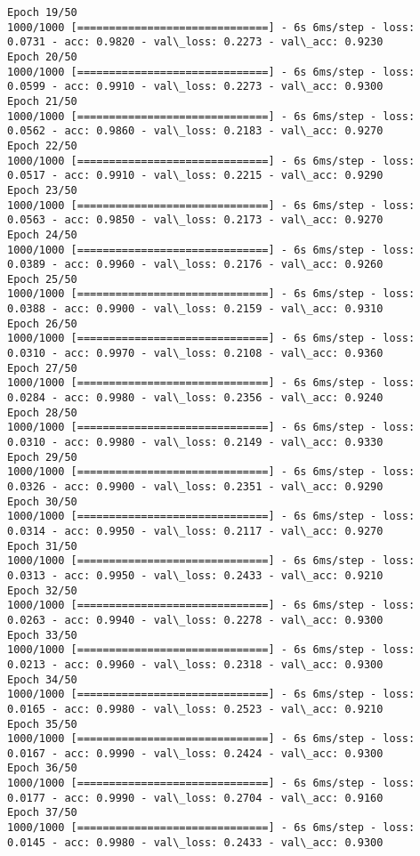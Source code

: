 \documentclass[11pt]{article}
\begin{document}
\begin{Verbatim}[commandchars=\\\{\}]
Epoch 19/50
1000/1000 [==============================] - 6s 6ms/step - loss: 0.0731 - acc: 0.9820 - val\_loss: 0.2273 - val\_acc: 0.9230
Epoch 20/50
1000/1000 [==============================] - 6s 6ms/step - loss: 0.0599 - acc: 0.9910 - val\_loss: 0.2273 - val\_acc: 0.9300
Epoch 21/50
1000/1000 [==============================] - 6s 6ms/step - loss: 0.0562 - acc: 0.9860 - val\_loss: 0.2183 - val\_acc: 0.9270
Epoch 22/50
1000/1000 [==============================] - 6s 6ms/step - loss: 0.0517 - acc: 0.9910 - val\_loss: 0.2215 - val\_acc: 0.9290
Epoch 23/50
1000/1000 [==============================] - 6s 6ms/step - loss: 0.0563 - acc: 0.9850 - val\_loss: 0.2173 - val\_acc: 0.9270
Epoch 24/50
1000/1000 [==============================] - 6s 6ms/step - loss: 0.0389 - acc: 0.9960 - val\_loss: 0.2176 - val\_acc: 0.9260
Epoch 25/50
1000/1000 [==============================] - 6s 6ms/step - loss: 0.0388 - acc: 0.9900 - val\_loss: 0.2159 - val\_acc: 0.9310
Epoch 26/50
1000/1000 [==============================] - 6s 6ms/step - loss: 0.0310 - acc: 0.9970 - val\_loss: 0.2108 - val\_acc: 0.9360
Epoch 27/50
1000/1000 [==============================] - 6s 6ms/step - loss: 0.0284 - acc: 0.9980 - val\_loss: 0.2356 - val\_acc: 0.9240
Epoch 28/50
1000/1000 [==============================] - 6s 6ms/step - loss: 0.0310 - acc: 0.9980 - val\_loss: 0.2149 - val\_acc: 0.9330
Epoch 29/50
1000/1000 [==============================] - 6s 6ms/step - loss: 0.0326 - acc: 0.9900 - val\_loss: 0.2351 - val\_acc: 0.9290
Epoch 30/50
1000/1000 [==============================] - 6s 6ms/step - loss: 0.0314 - acc: 0.9950 - val\_loss: 0.2117 - val\_acc: 0.9270
Epoch 31/50
1000/1000 [==============================] - 6s 6ms/step - loss: 0.0313 - acc: 0.9950 - val\_loss: 0.2433 - val\_acc: 0.9210
Epoch 32/50
1000/1000 [==============================] - 6s 6ms/step - loss: 0.0263 - acc: 0.9940 - val\_loss: 0.2278 - val\_acc: 0.9300
Epoch 33/50
1000/1000 [==============================] - 6s 6ms/step - loss: 0.0213 - acc: 0.9960 - val\_loss: 0.2318 - val\_acc: 0.9300
Epoch 34/50
1000/1000 [==============================] - 6s 6ms/step - loss: 0.0165 - acc: 0.9980 - val\_loss: 0.2523 - val\_acc: 0.9210
Epoch 35/50
1000/1000 [==============================] - 6s 6ms/step - loss: 0.0167 - acc: 0.9990 - val\_loss: 0.2424 - val\_acc: 0.9300
Epoch 36/50
1000/1000 [==============================] - 6s 6ms/step - loss: 0.0177 - acc: 0.9990 - val\_loss: 0.2704 - val\_acc: 0.9160
Epoch 37/50
1000/1000 [==============================] - 6s 6ms/step - loss: 0.0145 - acc: 0.9980 - val\_loss: 0.2433 - val\_acc: 0.9300

\end{Verbatim}
\end{document}
